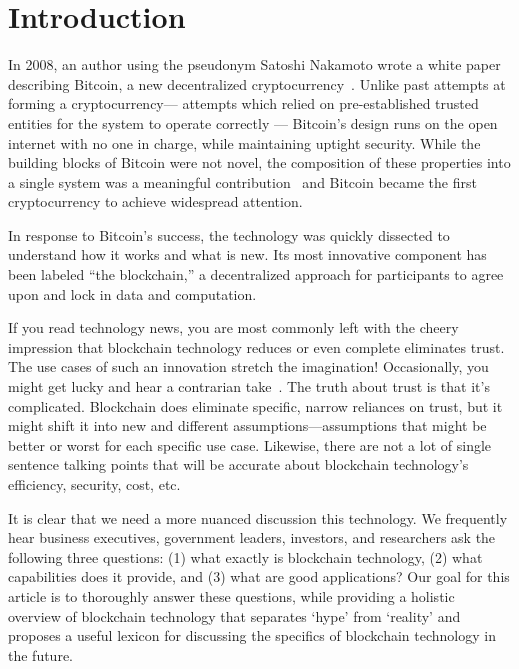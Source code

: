 
\section{Introduction}

In 2008, an author using the pseudonym Satoshi Nakamoto wrote a white paper describing Bitcoin, a new decentralized cryptocurrency~\cite{Nak08}. Unlike past attempts at forming a cryptocurrency--- attempts which relied on pre-established trusted entities for the system to operate correctly --- Bitcoin's design runs on the open internet with no one in charge, while maintaining uptight security. While the building blocks of Bitcoin were not novel, the composition of these properties into a single system was a meaningful contribution~\cite{Narayanan17} and Bitcoin became the first cryptocurrency to achieve widespread attention.

In response to Bitcoin's success, the technology was quickly dissected to understand how it works and what is new. Its most innovative component has been labeled ``the blockchain,'' a decentralized approach for participants to agree upon and lock in data and computation.

If you read technology news, you are most commonly left with the cheery impression that blockchain technology reduces or even complete eliminates trust. The use cases of such an innovation stretch the imagination! Occasionally, you might get lucky and hear a contrarian take~\cite{}. The truth about trust is that it's complicated. Blockchain does eliminate specific, narrow reliances on trust, but it might shift it into new and different assumptions---assumptions that might be better or worst for each specific use case. Likewise, there are not a lot of single sentence talking points that will be accurate about blockchain technology's efficiency, security, cost, etc. 

It is clear that we need a more nuanced discussion this technology. We frequently hear business executives, government leaders, investors, and researchers ask the following three questions: (1) what exactly is blockchain technology, (2) what capabilities does it provide, and (3) what are good applications? Our goal for this article is to thoroughly answer these questions, while providing a holistic overview of blockchain technology that separates `hype' from `reality' and proposes a useful lexicon for discussing the specifics of blockchain technology in the future.



